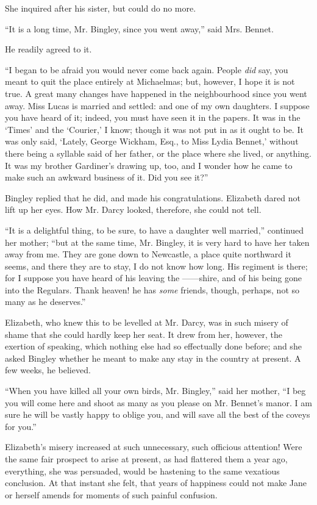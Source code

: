 \documentclass[12pt]{book}
\begin{document}
She inquired after his sister, but could do no more.

``It is a long time, Mr. Bingley, since you went away,'' said Mrs. Bennet.

He readily agreed to it.

``I began to be afraid you would never come back again. People \textit{did} say, you meant to quit the place entirely at Michaelmas; but, however, I hope it is not true. A great many changes have happened in the neighbourhood since you went away. Miss Lucas is married and settled: and one of my own daughters. I suppose you have heard of it; indeed, you must have seen it in the papers. It was in the `Times' and the `Courier,' I know; though it was not put in as it ought to be. It was only said, `Lately, George Wickham, Esq., to Miss Lydia Bennet,' without there being a syllable said of her father, or the place where she lived, or anything. It was my brother Gardiner's drawing up, too, and I wonder how he came to make such an awkward business of it. Did you see it?''

Bingley replied that he did, and made his congratulations. Elizabeth dared not lift up her eyes. How Mr. Darcy looked, therefore, she could not tell.

``It is a delightful thing, to be sure, to have a daughter well married,'' continued her mother; ``but at the same time, Mr. Bingley, it is very hard to have her taken away from me. They are gone down to Newcastle, a place quite northward it seems, and there they are to stay, I do not know how long. His regiment is there; for I suppose you have heard of his leaving the ------shire, and of his being gone into the Regulars. Thank heaven! he has \textit{some} friends, though, perhaps, not so many as he deserves.''

Elizabeth, who knew this to be levelled at Mr. Darcy, was in such misery of shame that she could hardly keep her seat. It drew from her, however, the exertion of speaking, which nothing else had so effectually done before; and she asked Bingley whether he meant to make any stay in the country at present. A few weeks, he believed.

``When you have killed all your own birds, Mr. Bingley,'' said her mother, ``I beg you will come here and shoot as many as you please on Mr. Bennet's manor. I am sure he will be vastly happy to oblige you, and will save all the best of the coveys for you.''

Elizabeth's misery increased at such unnecessary, such officious attention! Were the same fair prospect to arise at present, as had flattered them a year ago, everything, she was persuaded, would be hastening to the same vexatious conclusion. At that instant she felt, that years of happiness could not make Jane or herself amends for moments of such painful confusion.
\end{document}
